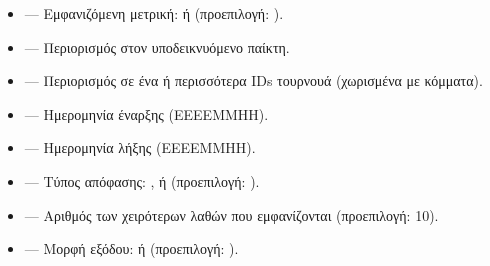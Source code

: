 \documentclass[letterpaper,10pt,greek]{sphinxmanual}
\begin{document}
\sphinxAtStartPar
{}
\begin{itemize}
\item {} 
\sphinxAtStartPar
{} — Εμφανιζόμενη μετρική:  ή  (προεπιλογή: ).

\item {} 
\sphinxAtStartPar
{} — Περιορισμός στον υποδεικνυόμενο παίκτη.

\item {} 
\sphinxAtStartPar
{} — Περιορισμός σε ένα ή περισσότερα IDs τουρνουά (χωρισμένα με κόμματα).

\item {} 
\sphinxAtStartPar
{} — Ημερομηνία έναρξης (ΕΕΕΕ\sphinxhyphen{}ΜΜ\sphinxhyphen{}ΗΗ).

\item {} 
\sphinxAtStartPar
{} — Ημερομηνία λήξης (ΕΕΕΕ\sphinxhyphen{}ΜΜ\sphinxhyphen{}ΗΗ).

\item {} 
\sphinxAtStartPar
{} — Τύπος απόφασης: ,  ή  (προεπιλογή: ).

\item {} 
\sphinxAtStartPar
{} — Αριθμός των χειρότερων λαθών που εμφανίζονται (προεπιλογή: 10).

\item {} 
\sphinxAtStartPar
{} — Μορφή εξόδου:  ή  (προεπιλογή: ).

\end{itemize}

\sphinxAtStartPar
{}
\end{document}
